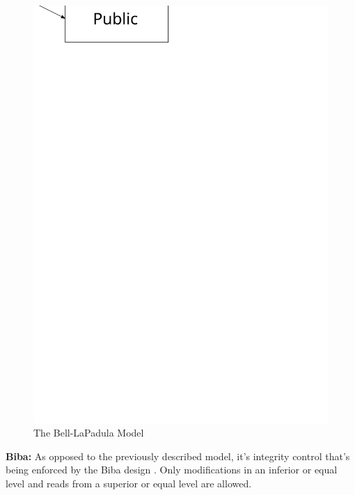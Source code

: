 \documentclass[pdftex,a4paper,titlepage,11pt]{article}
\begin{document}
\begin{figure}[h]
	\centering
	\includegraphics[scale=0.5]{bell-lp}
	\caption{The Bell-LaPadula Model}
\end{figure}

\bigskip

\textbf{Biba:} As opposed to the previously described model, it's integrity
control that's being enforced by the Biba design \cite{Biba}. Only modifications
in an inferior or equal level and reads from a superior or equal level are
allowed.
\end{document}
